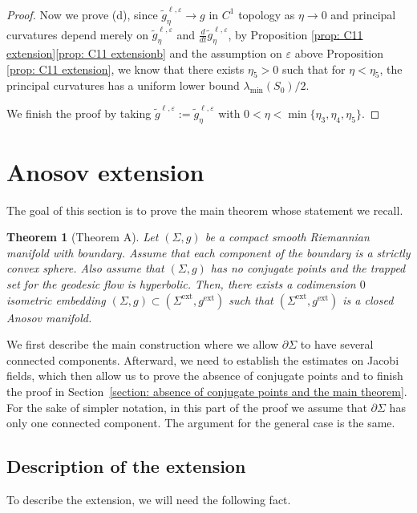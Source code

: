\documentclass[JEP,XML,SOM,Unicode,NoFloatCountersInSection]{cedram}
\newcommand{\ext}{\mathrm{ext}}
\newtheorem{theorem}{Theorem}[section]
\theoremstyle{definition}
\let\eps\varepsilon
\renewcommand{\>}{{\rangle}}
\newcommand{\<}{{\langle}}
\begin{document}
\begin{proof}
Now we prove (d), since $\tilde{g}^{\ell,\eps}_{\eta}\to g$ in $C^1$ topology as $\eta\to 0$ and principal curvatures depend merely on $\tilde{g}^{\ell,\eps}_{\eta}$ and $\frac{d}{dt}\tilde{g}^{\ell,\eps}_{\eta}$, by Proposition \ref{prop: C11 extension}\eqref{prop: C11 extensionb} and the assumption on $\eps$ above Proposition \ref{prop: C11 extension}, we know that there exists $\eta_5>0$ such that for $\eta<\eta_5$, the principal curvatures has a uniform lower bound $\lambda_{\min}(S_0)/2$.

We finish the proof by taking $\tilde{g}^{\ell,\eps}:=\tilde{g}^{\ell,\eps}_{\eta}$ with $0<\eta<\min\{\eta_3, \eta_4, \eta_5\}$.
\end{proof}

\section{Anosov extension}\label{sec: anosov_ext}

The goal of this section is to prove the main theorem whose statement we recall.

\begin{theorem}[Theorem A]\label{thm_anosov_ext}
Let $(\Sigma, g)$ be a compact smooth Riemannian manifold with boundary. Assume that each component of the boundary is a strictly convex sphere. Also assume that $(\Sigma, g)$ has no conjugate points and the trapped set for the geodesic flow is hyperbolic. Then, there exists a codimension $0$ isometric embedding $(\Sigma,g)\subset (\Sigma^{\ext}, g^{\ext})$ such that $(\Sigma^{\ext}, g^{\ext})$ is a closed Anosov manifold.
\end{theorem}

We first describe the main construction where we allow $\partial\Sigma$ to have several connected components. Afterward, we need to establish the estimates on Jacobi fields, which then allow us to prove the absence of conjugate points and to finish the proof in Section~\ref{section: absence of conjugate points and the main theorem}. For the sake of simpler notation, in this part of the proof we assume that $\partial\Sigma$ has only one connected component. The argument for the general case is the same.

\subsection{Description of the extension}\label{subsec: description}

To describe the extension, we will need the following fact.
\end{document}
